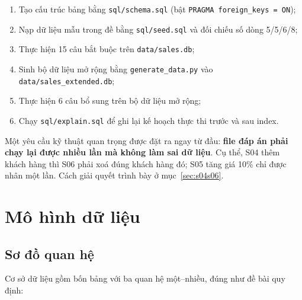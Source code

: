 \documentclass[12pt,a4paper]{article}
\newcommand{\code}[1]{\texttt{\small #1}}
\begin{document}
\begin{enumerate}[leftmargin=1.2cm,itemsep=2pt]
  \item Tạo cấu trúc bảng bằng \code{sql/schema.sql} (bật \code{PRAGMA foreign\_keys = ON});
  \item Nạp dữ liệu mẫu trong đề bằng \code{sql/seed.sql} và đối chiếu số dòng 5/5/6/8;
  \item Thực hiện 15 câu bắt buộc trên \code{data/sales.db};
  \item Sinh bộ dữ liệu mở rộng bằng \code{generate\_data.py} vào \code{data/sales\_extended.db};
  \item Thực hiện 6 câu bổ sung trên bộ dữ liệu mở rộng;
  \item Chạy \code{sql/explain.sql} để ghi lại kế hoạch thực thi trước và sau index.
\end{enumerate}

Một yêu cầu kỹ thuật quan trọng được đặt ra ngay từ đầu: \textbf{file đáp án phải chạy lại được
nhiều lần mà không làm sai dữ liệu}. Cụ thể, S04 thêm khách hàng thì S06 phải xoá đúng khách
hàng đó; S05 tăng giá 10\% chỉ được nhân một lần. Cách giải quyết trình bày ở mục~\ref{sec:s04s06}.

\section{Mô hình dữ liệu}

\subsection{Sơ đồ quan hệ}

Cơ sở dữ liệu gồm bốn bảng với ba quan hệ một--nhiều, đúng như đề bài quy định:
\end{document}
